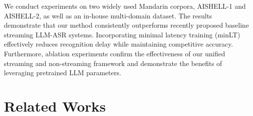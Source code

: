 \documentclass{article}
\begin{document}


We conduct experiments on two widely used Mandarin corpora, AISHELL-1 and AISHELL-2, as well as an in-house multi-domain dataset. The results demonstrate that our method consistently outperforms recently proposed baseline streaming LLM-ASR systems. Incorporating minimal latency training (minLT) effectively reduces recognition delay while maintaining competitive accuracy. Furthermore, ablation experiments confirm the effectiveness of our unified streaming and non-streaming framework and demonstrate the benefits of leveraging pretrained LLM parameters.



\section{Related Works}

\end{document}
